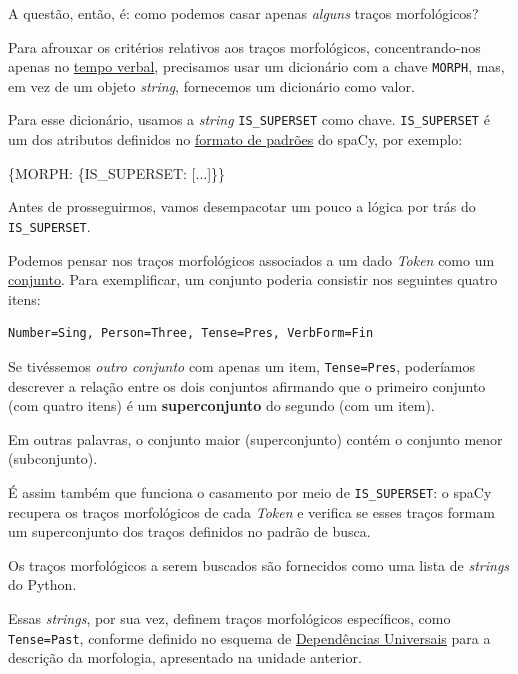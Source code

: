 \documentclass[
  brazilian,
]{article}
\newenvironment{Shaded}{}{}
\newcommand{\NormalTok}[1]{#1}
\newcommand{\StringTok}[1]{\textcolor[rgb]{0.25,0.44,0.63}{#1}}
\begin{document}
A questão, então, é: como podemos casar apenas \emph{alguns} traços
morfológicos?

Para afrouxar os critérios relativos aos traços morfológicos,
concentrando-nos apenas no
\href{https://pt.wikipedia.org/wiki/Tempo_(gram\%C3\%A1tica)}{tempo
verbal}, precisamos usar um dicionário com a chave \texttt{MORPH}, mas,
em vez de um objeto \emph{string}, fornecemos um dicionário como valor.

Para esse dicionário, usamos a \emph{string} \texttt{IS\_SUPERSET} como
chave. \texttt{IS\_SUPERSET} é um dos atributos definidos no
\href{https://spacy.io/api/matcher\#patterns}{formato de padrões} do
spaCy, por exemplo:

\begin{Shaded}
\begin{Highlighting}[]
\NormalTok{\{}\StringTok{\textquotesingle{}MORPH\textquotesingle{}}\NormalTok{: \{}\StringTok{\textquotesingle{}IS\_SUPERSET\textquotesingle{}}\NormalTok{: [...]\}\}}
\end{Highlighting}
\end{Shaded}

Antes de prosseguirmos, vamos desempacotar um pouco a lógica por trás do
\texttt{IS\_SUPERSET}.

Podemos pensar nos traços morfológicos associados a um dado \emph{Token}
como um \href{https://pt.wikipedia.org/wiki/Conjunto}{conjunto}. Para
exemplificar, um conjunto poderia consistir nos seguintes quatro itens:

\begin{verbatim}
Number=Sing, Person=Three, Tense=Pres, VerbForm=Fin
\end{verbatim}

Se tivéssemos \emph{outro conjunto} com apenas um item,
\texttt{Tense=Pres}, poderíamos descrever a relação entre os dois
conjuntos afirmando que o primeiro conjunto (com quatro itens) é um
\textbf{superconjunto} do segundo (com um item).

Em outras palavras, o conjunto maior (superconjunto) contém o conjunto
menor (subconjunto).

É assim também que funciona o casamento por meio de
\texttt{IS\_SUPERSET}: o spaCy recupera os traços morfológicos de cada
\emph{Token} e verifica se esses traços formam um superconjunto dos
traços definidos no padrão de busca.

Os traços morfológicos a serem buscados são fornecidos como uma lista de
\emph{strings} do Python.

Essas \emph{strings}, por sua vez, definem traços morfológicos
específicos, como \texttt{Tense=Past}, conforme definido no esquema de
\href{https://universaldependencies.org/u/overview/morphology.html}{Dependências
Universais} para a descrição da morfologia, apresentado na unidade
anterior.
\end{document}
